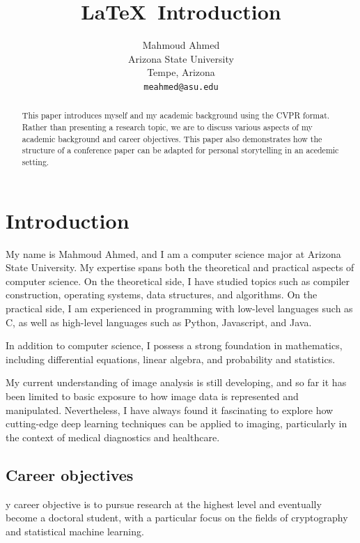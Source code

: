 \documentclass[10pt,twocolumn,letterpaper]{article}
\begin{document}
\title{\LaTeX\ Introduction}

\author{Mahmoud Ahmed\\
Arizona State University\\
Tempe, Arizona\\
{\tt\small meahmed@asu.edu}
}

\maketitle

\begin{abstract}
This paper introduces myself and my academic background using the CVPR
   format. Rather than presenting a research topic, we are to discuss 
   various aspects of my academic background and career objectives. 
   This paper also demonstrates how the structure of a conference paper 
   can be adapted for personal storytelling in an acedemic setting.
\end{abstract}

\section{Introduction}
My name is Mahmoud Ahmed, and I am a computer science major 
at Arizona State University. My expertise spans both the theoretical 
and practical aspects of computer science. On the theoretical side, 
I have studied topics such as compiler construction, operating systems, 
data structures, and algorithms. On the practical side, 
I am experienced in programming with low-level languages such as C, 
as well as high-level languages such as Python, Javascript, and Java.

In addition to computer science, I possess a strong foundation in 
mathematics, including differential equations, linear algebra, and 
probability and statistics.


My current understanding of image analysis is still developing, 
and so far it has been limited to basic exposure to how image data is
 represented and manipulated. Nevertheless, I have always found it
  fascinating to explore how cutting-edge deep learning techniques can
   be applied to imaging, 
particularly in the context of medical diagnostics and healthcare.

\subsection{Career objectives}
y career objective is to pursue research at the highest level 
and eventually become a doctoral student, with a 
particular focus on the fields of cryptography and statistical machine learning.
\end{document}
